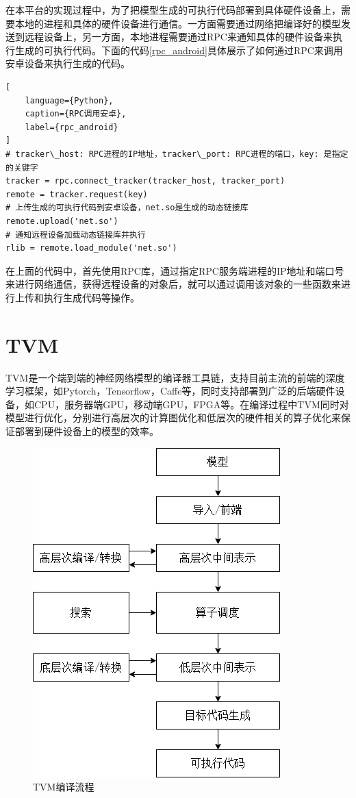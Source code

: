 在本平台的实现过程中，为了把模型生成的可执行代码部署到具体硬件设备上，需要本地的进程和具体的硬件设备进行通信。一方面需要通过网络把编译好的模型发送到远程设备上，另一方面，本地进程需要通过RPC来通知具体的硬件设备来执行生成的可执行代码。下面的代码\ref{rpc_android}具体展示了如何通过RPC来调用安卓设备来执行生成的代码。

\begin{lstlisting}[
    language={Python},
    caption={RPC调用安卓},
    label={rpc_android}
]
# tracker\_host: RPC进程的IP地址，tracker\_port: RPC进程的端口，key: 是指定的关键字
tracker = rpc.connect_tracker(tracker_host, tracker_port)
remote = tracker.request(key)
# 上传生成的可执行代码到安卓设备，net.so是生成的动态链接库
remote.upload('net.so')
# 通知远程设备加载动态链接库并执行
rlib = remote.load_module('net.so')
\end{lstlisting}

在上面的代码中，首先使用RPC库，通过指定RPC服务端进程的IP地址和端口号来进行网络通信，获得远程设备的对象后，就可以通过调用该对象的一些函数来进行上传和执行生成代码等操作。


\section{TVM}

TVM是一个端到端的神经网络模型的编译器工具链，支持目前主流的前端的深度学习框架，如Pytorch，Tensorflow，Caffe等，同时支持部署到广泛的后端硬件设备，如CPU，服务器端GPU，移动端GPU，FPGA等。在编译过程中TVM同时对模型进行优化，分别进行高层次的计算图优化和低层次的硬件相关的算子优化来保证部署到硬件设备上的模型的效率。

\begin{figure}[h!]
    \centering
    \includegraphics[width=180bp]{figure/tvm.png}
    \caption{TVM编译流程}
    \label{tvm_compile}
\end{figure}

